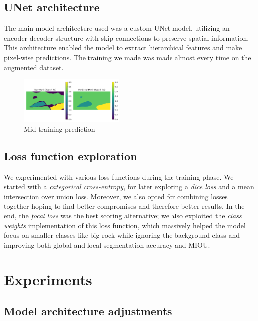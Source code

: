 \documentclass[11pt]{article}
\begin{document}
\begin{multicols}{2}
        \subsection{UNet architecture}
        
        The main model architecture used was a custom UNet model, utilizing an encoder-decoder structure with skip connections to preserve spatial information. 
        This architecture enabled the model to extract hierarchical features and make pixel-wise predictions. 
        The training we made was made almost every time on the augmented dataset.

        \begin{figure}[H]
            \centering
            \includegraphics[width=0.45\textwidth]{reports/images/prediction1.png}
            \caption{\small Mid-training prediction}
        \end{figure}
        
        \subsection{Loss function exploration}
        
        We experimented with various loss functions during the training phase.
        We started with a \textit{categorical cross-entropy}, for later exploring a \textit{dice loss} and a {mean intersection over union loss}.
        Moreover, we also opted for combining losses together hoping to find better compromises and therefore better results.
        In the end, the \textit{focal loss} was the best scoring alternative; we also exploited the \textit{class weights} implementation of this loss function, which massively helped the model focus on smaller classes like {big rock} while ignoring the background class and improving both global and local segmentation accuracy and MIOU.
        
        \section{Experiments}
        
        \subsection{Model architecture adjustments}
        

\end{multicols}
\end{document}
